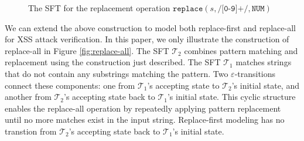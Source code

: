 \begin{figure}[h] \centering
  \caption{The SFT for the replacement operation $\texttt{replace}(s,\texttt{/[0-9]+/}, \texttt{NUM})$}
  \label{fig-rearranged-automata}
  \end{figure}

  We can extend the above construction to model both replace-first and replace-all for XSS attack verification. In this paper, we only illustrate the construction of replace-all in Figure \ref{fig:replace-all}. The SFT $\mathcal{T}_2$ combines pattern matching and replacement using the construction just described. The SFT $\mathcal{T}_1$ matches strings that do not contain any substrings matching the pattern. Two $\varepsilon$-transitions connect these components: one from $\mathcal{T}_1$'s accepting state to $\mathcal{T}_2$'s initial state, and another from $\mathcal{T}_2$'s accepting state back to $\mathcal{T}_1$'s initial state. This cyclic structure enables the replace-all operation by repeatedly applying pattern replacement until no more matches exist in the input string. Replace-first modeling has no transtion from $\mathcal{T}_2$'s accepting state back to $\mathcal{T}_1$'s initial state.




